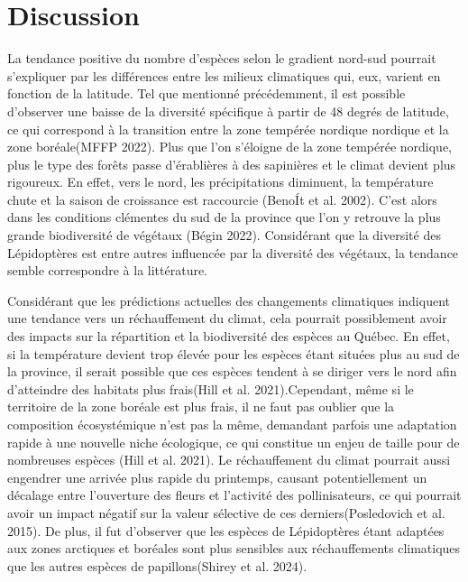 \documentclass[conference,final,]{IEEEtran}
\begin{document}
\section{Discussion}\label{discussion}

La tendance positive du nombre d'espèces selon le gradient nord-sud
pourrait s'expliquer par les différences entre les milieux climatiques
qui, eux, varient en fonction de la latitude. Tel que mentionné
précédemment, il est possible d'observer une baisse de la diversité
spécifique à partir de 48 degrés de latitude, ce qui correspond à la
transition entre la zone tempérée nordique nordique et la zone
boréale(MFFP 2022). Plus que l'on s'éloigne de la zone tempérée
nordique, plus le type des forêts passe d'érablières à des sapinières et
le climat devient plus rigoureux. En effet, vers le nord, les
précipitations diminuent, la température chute et la saison de
croissance est raccourcie (BenoÍt et al. 2002). C'est alors dans les
conditions clémentes du sud de la province que l'on y retrouve la plus
grande biodiversité de végétaux (Bégin 2022). Considérant que la
diversité des Lépidoptères est entre autres influencée par la diversité
des végétaux, la tendance semble correspondre à la littérature.

Considérant que les prédictions actuelles des changements climatiques
indiquent une tendance vers un réchauffement du climat, cela pourrait
possiblement avoir des impacts sur la répartition et la biodiversité des
espèces au Québec. En effet, si la température devient trop élevée pour
les espèces étant situées plus au sud de la province, il serait possible
que ces espèces tendent à se diriger vers le nord afin d'atteindre des
habitats plus frais(Hill et al. 2021).Cependant, même si le territoire
de la zone boréale est plus frais, il ne faut pas oublier que la
composition écosystémique n'est pas la même, demandant parfois une
adaptation rapide à une nouvelle niche écologique, ce qui constitue un
enjeu de taille pour de nombreuses espèces (Hill et al. 2021). Le
réchauffement du climat pourrait aussi engendrer une arrivée plus rapide
du printemps, causant potentiellement un décalage entre l'ouverture des
fleurs et l'activité des pollinisateurs, ce qui pourrait avoir un impact
négatif sur la valeur sélective de ces derniers(Posledovich et al.
2015). De plus, il fut d'observer que les espèces de Lépidoptères étant
adaptées aux zones arctiques et boréales sont plus sensibles aux
réchauffements climatiques que les autres espèces de papillons(Shirey et
al. 2024).
\end{document}
